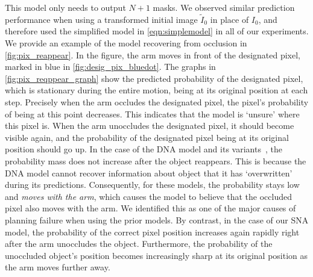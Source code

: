 This model only needs to output $N+1$ masks. We observed similar prediction performance when using a transformed initial image $\tilde{I}_0$ in place of $I_0$, and therefore used the simplified model in \autoref{eqn:simplemodel} in all of our experiments. We provide an example of the model recovering from occlusion in \autoref{fig:pix_reappear}. In the figure, the arm moves in front of the designated pixel, marked in blue in \autoref{fig:desig_pix_bluedot}. The graphs in \autoref{fig:pix_reqppear_graph} show the predicted probability of the designated pixel, which is stationary during the entire motion, being at its original position at each step. Precisely when the arm occludes the designated pixel, the pixel's probability of being at this point decreases. This indicates that the model is `unsure' where this pixel is. When the arm unoccludes the designated pixel, it should become visible again, and the probability of the designated pixel being at its original position should go up. In the case of the DNA model and its variants~\cite{finn_nips}, the probability mass does not increase after the object reappears. This is because the DNA model cannot recover information about object that it has `overwritten' during its predictions.
Consequently, for these models, the probability stays low and \emph{moves with the arm}, which causes the model to believe that the occluded pixel also moves with the arm. We identified this as one of the major causes of planning failure when using the prior models. By contrast, in the case of our SNA model, the probability of the correct pixel position increases again rapidly right after the arm unoccludes the object. Furthermore, the probability of the unoccluded object's position becomes increasingly sharp at its original position as the arm moves further away.